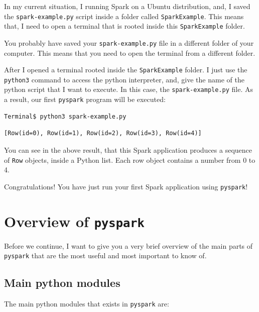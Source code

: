\documentclass[
  11pt,
  letterpaper,
  DIV=11,
  numbers=noendperiod]{scrreprt}
\begin{document}
In my current situation, I running Spark on a Ubuntu distribution, and,
I saved the \texttt{spark-example.py} script inside a folder called
\texttt{SparkExample}. This means that, I need to open a terminal that
is rooted inside this \texttt{SparkExample} folder.

You probably have saved your \texttt{spark-example.py} file in a
different folder of your computer. This means that you need to open the
terminal from a different folder.

After I opened a terminal rooted inside the \texttt{SparkExample}
folder. I just use the \texttt{python3} command to access the python
interpreter, and, give the name of the python script that I want to
execute. In this case, the \texttt{spark-example.py} file. As a result,
our first \texttt{pyspark} program will be executed:

\begin{verbatim}
Terminal$ python3 spark-example.py
\end{verbatim}

\begin{verbatim}
[Row(id=0), Row(id=1), Row(id=2), Row(id=3), Row(id=4)]
\end{verbatim}

You can see in the above result, that this Spark application produces a
sequence of \texttt{Row} objects, inside a Python list. Each row object
contains a number from 0 to 4.

Congratulations! You have just run your first Spark application using
\texttt{pyspark}!

\section{\texorpdfstring{Overview of
\texttt{pyspark}}{Overview of pyspark}}\label{overview-of-pyspark}

Before we continue, I want to give you a very brief overview of the main
parts of \texttt{pyspark} that are the most useful and most important to
know of.

\subsection{Main python modules}\label{main-python-modules}

The main python modules that exists in \texttt{pyspark} are:
\end{document}
